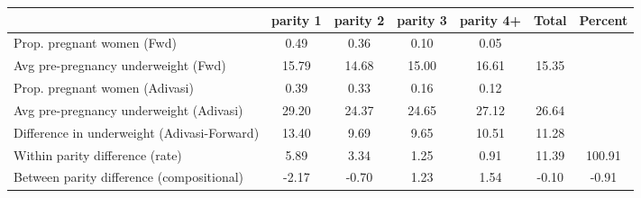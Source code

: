 \begin{tabular}{l*{6}{c}}
\toprule
            &\multicolumn{1}{c}{parity 1}&\multicolumn{1}{c}{parity 2}&\multicolumn{1}{c}{parity 3}&\multicolumn{1}{c}{parity 4+}&\multicolumn{1}{c}{Total}&\multicolumn{1}{c}{Percent}\\
\midrule
\midrule
Prop. pregnant women (Fwd)&        0.49&        0.36&        0.10&        0.05&            &            \\
Avg pre-pregnancy underweight (Fwd)&       15.79&       14.68&       15.00&       16.61&       15.35&            \\
Prop. pregnant women (Adivasi)&        0.39&        0.33&        0.16&        0.12&            &            \\
Avg pre-pregnancy underweight (Adivasi)&       29.20&       24.37&       24.65&       27.12&       26.64&            \\
Difference in underweight (Adivasi-Forward)&       13.40&        9.69&        9.65&       10.51&       11.28&            \\
Within parity difference (rate)&        5.89&        3.34&        1.25&        0.91&       11.39&      100.91\\
Between parity difference (compositional)&       -2.17&       -0.70&        1.23&        1.54&       -0.10&       -0.91\\
\bottomrule
\end{tabular}
